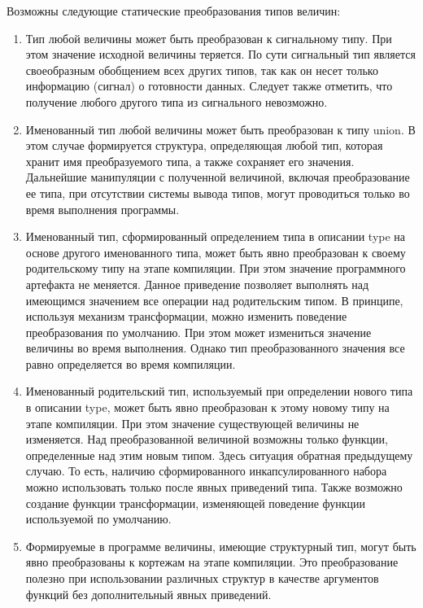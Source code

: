 {Возможны следующие статические преобразования типов величин:

\begin{enumerate}
    \item Тип любой величины может быть преобразован к сигнальному типу. При этом значение исходной величины теряется. По сути сигнальный тип является своеобразным обобщением всех других типов, так как он несет только информацию (сигнал) о готовности данных. Следует также отметить, что получение любого другого типа из сигнального невозможно.
    \item Именованный тип любой величины может быть преобразован к типу union. В этом случае формируется структура, определяющая любой тип, которая хранит имя преобразуемого типа, а также сохраняет его значения. Дальнейшие манипуляции с полученной величиной, включая преобразование ее типа, при отсутствии системы вывода типов, могут проводиться только во время выполнения программы.
    \item Именованный тип, сформированный определением типа в описании type на основе другого именованного типа, может быть явно преобразован к своему родительскому типу на этапе компиляции. При этом значение программного артефакта не меняется. Данное приведение позволяет выполнять над имеющимся значением все операции над родительским типом. В принципе, используя механизм трансформации, можно изменить поведение преобразования по умолчанию. При этом может измениться значение величины во время выполнения. Однако тип преобразованного значения все равно определяется во время компиляции.
    \item Именованный родительский тип, используемый при определении нового типа в описании type, может быть явно преобразован к этому новому типу на этапе компиляции. При этом значение существующей величины не изменяется. Над преобразованной величиной возможны только функции, определенные над этим новым типом. Здесь ситуация обратная предыдущему случаю. То есть, наличию сформированного инкапсулированного набора можно использовать только после явных приведений типа. Также возможно создание функции трансформации, изменяющей поведение функции используемой по умолчанию.
    \item Формируемые в программе величины, имеющие структурный тип, могут быть явно преобразованы к кортежам на этапе компиляции. Это преобразование полезно при использовании различных структур в качестве аргументов функций без дополнительный явных приведений.
\end{enumerate}

}
